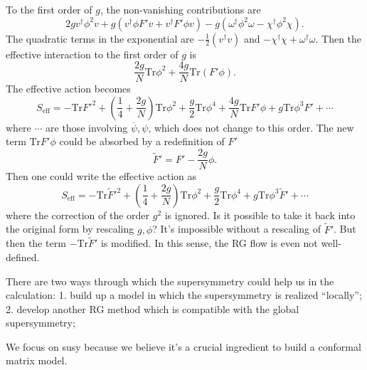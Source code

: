 To the first order of $g$, the non-vanishing contributions are
\[
2g v^\dagger \phi^2 v 
+ g (v^\dagger \phi F' v + v^\dagger F' \phi v) 
- g(\omega^\dagger \phi^2 \omega - \chi^\dagger \phi^2 \chi)
.\] 
The quadratic terms in the exponential are $-\frac{1}{2}(v^\dagger v)$
and $-\chi^\dagger \chi + \omega^\dagger \omega$.
Then the effective interaction to the first order of $g$ is
\[
\frac{2g}{N} \mathrm{Tr} \phi^2 + \frac{4g}{N} \mathrm{Tr} (F'\phi)
.\] 
The effective action becomes
\begin{equation}
	S_{\text{eff}} = - \mathrm{Tr} F'^2
	+ \left( \frac{1}{4} + \frac{2g}{N} \right) \mathrm{Tr}\phi^2
	+ \frac{g}{2} \mathrm{Tr} \phi^4
	+ \frac{4g}{N} \mathrm{Tr} F'\phi
	+ g \mathrm{Tr} \phi^3 F'
	+ \cdots
\end{equation}
where $\cdots$ are those involving $\overline{\psi},\psi$,
which does not change to this order.
The new term $\mathrm{Tr}F'\phi$ could be absorbed by a redefinition of $F'$
\[
	\tilde{F}' = F' - \frac{2g}{N} \phi
.\] 
Then one could write the effective action as 
\begin{equation}
	S_{\text{eff}} = -\mathrm{Tr} \tilde{F}'^2
	+ \left( \frac{1}{4} + \frac{2g}{N} \right) \mathrm{Tr}\phi^2
	+ \frac{g}{2} \mathrm{Tr} \phi^4
	+ g \mathrm{Tr} \phi^3 \tilde{F}'
	+ \cdots
\end{equation}
where the correction of the order $g^2$ is ignored.
Is it possible to take it back into the original form by rescaling $g,\phi$?
It's impossible without a rescaling of $\tilde{F}'$.
But then the term $-\mathrm{Tr}\tilde{F}'$ is modified.
In this sense, the RG flow is even not well-defined.

\begin{idea}
There are two ways through which the supersymmetry could help us in the calculation: 1. build up a model in which the supersymmetry is realized ``locally''; 2. develop another RG method which is compatible with the global supersymmetry;

We focus on susy because we believe it's a crucial ingredient to build a conformal matrix model.
\end{idea}
